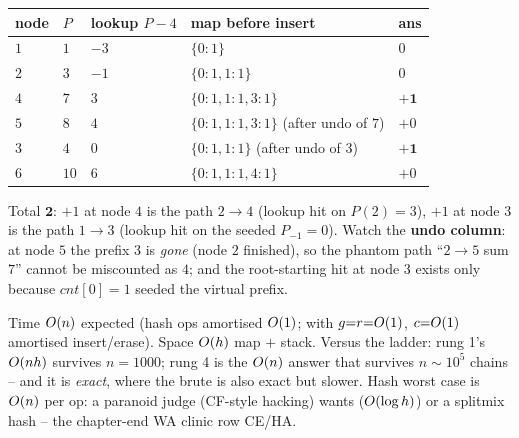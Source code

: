 \begin{tracebox}[On $R$, target $4$]
\begin{center}\small\renewcommand{\arraystretch}{1.25}
\begin{tabular}{@{}lllll@{}}
\textbf{node} & $P$ & \textbf{lookup }$P-4$ & \textbf{map before insert} & \textbf{ans} \\
\toprule
$1$ & $1$ & $-3$ & $\{0{:}1\}$ & $0$ \\
$2$ & $3$ & $-1$ & $\{0{:}1,1{:}1\}$ & $0$ \\
$4$ & $7$ & $3$  & $\{0{:}1,1{:}1,3{:}1\}$ & $\mathbf{+1}$ \\
$5$ & $8$ & $4$  & $\{0{:}1,1{:}1,3{:}1\}$ (after undo of $7$) & $+0$ \\
$3$ & $4$ & $0$  & $\{0{:}1,1{:}1\}$ (after undo of $3$) & $\mathbf{+1}$ \\
$6$ & $10$ & $6$ & $\{0{:}1,1{:}1,4{:}1\}$ & $+0$ \\
\bottomrule
\end{tabular}\end{center}
Total $\mathbf{2}$: $+1$ at node $4$ is the path $2\to4$ (lookup hit on $P(2)=3$),
$+1$ at node $3$ is the path $1\to3$ (lookup hit on the seeded $P_{-1}=0$).
Watch the \textbf{undo column}: at node $5$ the prefix $3$ is \emph{gone} (node
$2$ finished), so the
phantom path ``$2\to5$ sum $7$'' cannot be miscounted as $4$; and the
root-starting hit at node $3$ exists only because $cnt[0]=1$ seeded the
virtual prefix.
\end{tracebox}

\begin{complexitybox}
Time $O(n)$ expected (hash ops amortised $O(1)$; 
with $g{=}r{=}O(1)$, $c{=}O(1)$ amortised insert/erase). Space $O(h)$
map $+$ stack. Versus the ladder: rung 1's $O(nh)$ survives $n{=}1000$;
rung 4 is the $O(n)$ answer that survives $n \sim 10^{5}$ chains -- and it
is \emph{exact}, where the brute is also exact but slower. Hash worst case is
$O(n)$ per op: a paranoid judge (CF-style hacking) wants 
($O(\log h)$) or a splitmix hash -- the chapter-end WA clinic row CE/HA.
\end{complexitybox}

